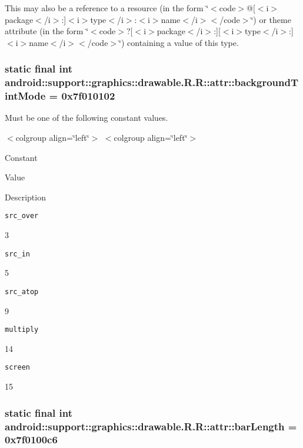 This may also be a reference to a resource (in the form \char`\"{}$<$code$>$@\mbox{[}$<$i$>$package$<$/i$>$:\mbox{]}$<$i$>$type$<$/i$>$:$<$i$>$name$<$/i$>$$<$/code$>$\char`\"{}) or theme attribute (in the form \char`\"{}$<$code$>$?\mbox{[}$<$i$>$package$<$/i$>$:\mbox{]}\mbox{[}$<$i$>$type$<$/i$>$:\mbox{]}$<$i$>$name$<$/i$>$$<$/code$>$\char`\"{}) containing a value of this type. \hypertarget{classandroid_1_1support_1_1graphics_1_1drawable_1_1_r_1_1attr_7747a9f3c067ffc3c14284f17d9fb3a1}{
\subsubsection[{backgroundTintMode}]{\setlength{\rightskip}{0pt plus 5cm}static final int android::support::graphics::drawable.R.R::attr::backgroundTintMode = 0x7f010102}}
\label{classandroid_1_1support_1_1graphics_1_1drawable_1_1_r_1_1attr_7747a9f3c067ffc3c14284f17d9fb3a1}


Must be one of the following constant values. \begin{TabularC}{0}
\hline
\end{TabularC}
$<$colgroup align=\char`\"{}left\char`\"{}$>$ $<$colgroup align=\char`\"{}left\char`\"{}$>$ 

Constant

Value

Description 

{\tt src\_\-over}

3

{\tt src\_\-in}

5

{\tt src\_\-atop}

9

{\tt multiply}

14

{\tt screen}

15\hypertarget{classandroid_1_1support_1_1graphics_1_1drawable_1_1_r_1_1attr_95df63afa5f70c05cff0de7cefdf6333}{
\subsubsection[{barLength}]{\setlength{\rightskip}{0pt plus 5cm}static final int android::support::graphics::drawable.R.R::attr::barLength = 0x7f0100c6}}
\label{classandroid_1_1support_1_1graphics_1_1drawable_1_1_r_1_1attr_95df63afa5f70c05cff0de7cefdf6333}



